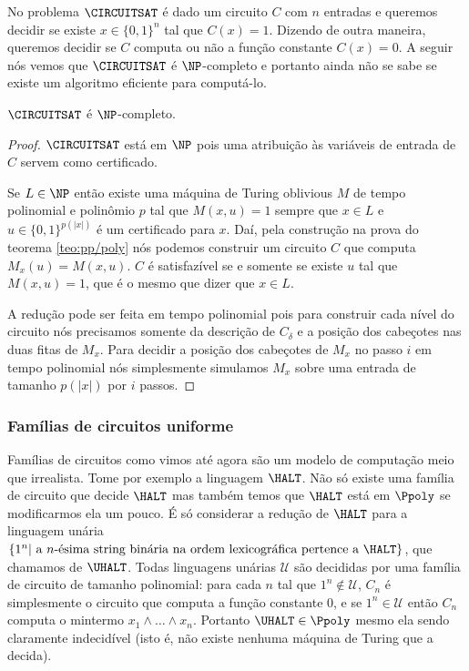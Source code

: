 No problema $\CIRCUITSAT$ é dado um circuito $C$ com $n$ entradas e queremos decidir se existe $x \in \{0, 1\}^{n}$ tal que $C(x) = 1$. Dizendo de outra maneira, queremos decidir se $C$ computa ou não a função constante $C(x) = 0$. A seguir nós vemos que $\CIRCUITSAT$ é $\NP$-completo e portanto ainda não se sabe se existe um algoritmo eficiente para computá-lo.

\begin{teo}

$\CIRCUITSAT$ é $\NP$-completo.

\end{teo} 

\begin{proof}

$\CIRCUITSAT$ está em $\NP$ pois uma atribuição às variáveis de entrada de $C$ servem como certificado.

Se $L \in \NP$ então existe uma máquina de Turing oblivious $M$ de tempo polinomial e polinômio $p$ tal que $M(x, u) = 1$ sempre que $x \in L$ e $u \in \{0, 1\}^{p(\lvert x\rvert)}$ é um certificado para $x$. Daí, pela construção na prova do teorema \ref{teo:pp/poly} nós podemos construir um circuito $C$ que computa $M_{x}(u) = M(x, u)$. $C$ é satisfazível se e somente se existe $u$ tal que $M(x, u) = 1$, que é o mesmo que dizer que $x \in L$.

A redução pode ser feita em tempo polinomial pois para construir cada nível do circuito nós precisamos somente da descrição de $C_{\delta}$ e a posição dos cabeçotes nas duas fitas de $M_{x}$. Para decidir a posição dos cabeçotes de $M_{x}$ no passo $i$ em tempo polinomial nós simplesmente simulamos $M_{x}$ sobre uma entrada de tamanho $p(\lvert x\rvert)$ por $i$ passos.

\end{proof}

\subsubsection{Famílias de circuitos uniforme}

Famílias de circuitos como vimos até agora são um modelo de computação meio que irrealista. Tome por exemplo a linguagem $\HALT$. Não só existe uma família de circuito que decide $\HALT$ mas também temos que $\HALT$ está em $\Ppoly$ se modificarmos ela um pouco. É só considerar a redução de $\HALT$ para a linguagem unária $\{1^{n} \vert \text{ a } n\text{-ésima string binária na ordem lexicográfica pertence a } \HALT\}$, que chamamos de $\UHALT$. Todas linguagens unárias $\mathcal{U}$ são decididas por uma família de circuito de tamanho polinomial: para cada $n$ tal que $1^{n} \notin \mathcal{U}$, $C_{n}$ é simplesmente o circuito que computa a função constante 0, e se $1^{n} \in \mathcal{U}$ então $C_{n}$ computa o mintermo $x_{1} \land \dots \land x_{n}$. Portanto $\UHALT \in \Ppoly$ mesmo ela sendo claramente indecidível (isto é, não existe nenhuma máquina de Turing que a decida).

